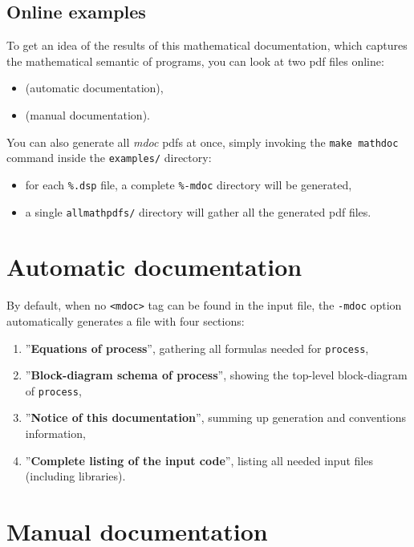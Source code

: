 \subsection{Online examples}
\label{sec:mdoc-examples}

To get an idea of the results of this mathematical documentation, which captures the mathematical semantic of \faust programs, you can look at two pdf files online:
\begin{itemize}
\item {} (automatic documentation),
\item {} (manual documentation).
\end{itemize}

You can also generate all \emph{mdoc} pdfs at once, simply invoking the \lstinline!make mathdoc! command inside the \lstinline!examples/! directory: 
\begin{itemize}
\item for each \lstinline!%.dsp! file, a complete \lstinline!%-mdoc! directory will be generated,
\item a single \lstinline!allmathpdfs/! directory will gather all the generated pdf files.
\end{itemize}


\section{Automatic documentation}
\label{sec:auto-docum}

By default, when no \lstinline!<mdoc>! tag can be found in the input \faust file, the \lstinline!-mdoc! option automatically generates a \latex file with four sections:
\begin{enumerate}
\item ''\textbf{Equations of process}'', gathering all formulas needed for \lstinline!process!,
\item ''\textbf{Block-diagram schema of process}'', showing the top-level block-diagram of \lstinline!process!,
\item ''\textbf{Notice of this documentation}'', summing up generation and conventions information,
\item ''\textbf{Complete listing of the input code}'', listing all needed input files (including libraries).
\end{enumerate}


\section{Manual documentation}
\label{sec:manual-mdoc}

